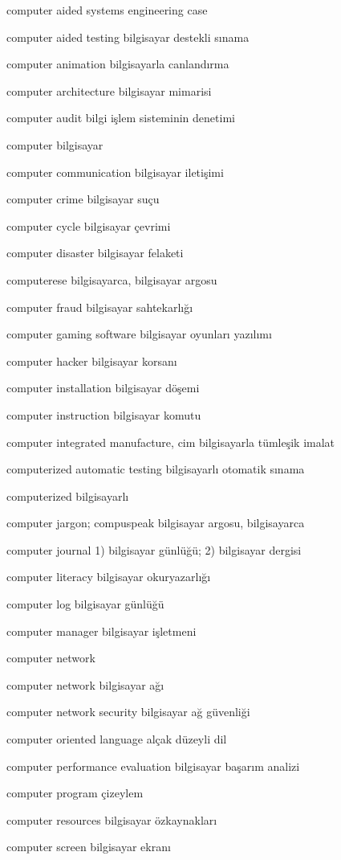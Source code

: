 \documentclass[12pt,fleqn]{article}\usepackage{../../common}
\begin{document}
computer aided systems engineering case

computer aided testing bilgisayar destekli sınama

computer animation bilgisayarla canlandırma

computer architecture bilgisayar mimarisi

computer audit bilgi işlem sisteminin denetimi

computer bilgisayar

computer communication bilgisayar iletişimi

computer crime bilgisayar suçu

computer cycle bilgisayar çevrimi

computer disaster bilgisayar felaketi

computerese bilgisayarca, bilgisayar argosu

computer fraud bilgisayar sahtekarlığı

computer gaming software bilgisayar oyunları yazılımı

computer hacker bilgisayar korsanı

computer installation bilgisayar döşemi

computer instruction bilgisayar komutu

computer integrated manufacture, cim bilgisayarla tümleşik imalat

computerized automatic testing bilgisayarlı otomatik sınama

computerized bilgisayarlı

computer jargon; compuspeak bilgisayar argosu, bilgisayarca

computer journal 1) bilgisayar günlüğü; 2) bilgisayar dergisi

computer literacy bilgisayar okuryazarlığı

computer log bilgisayar günlüğü

computer manager bilgisayar işletmeni

computer network

computer network bilgisayar ağı

computer network security bilgisayar ağ güvenliği

computer oriented language alçak düzeyli dil

computer performance evaluation bilgisayar başarım analizi

computer program çizeylem

computer resources bilgisayar özkaynakları

computer screen bilgisayar ekranı
\end{document}
